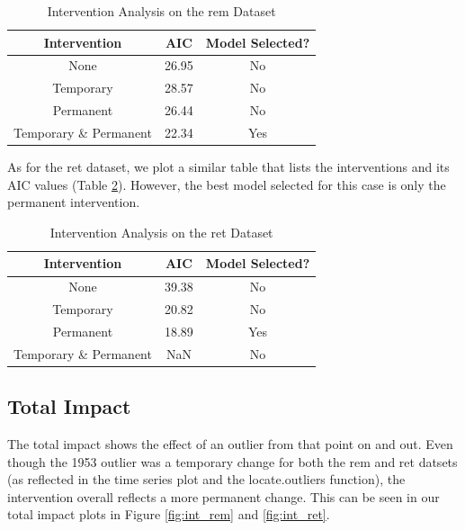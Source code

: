\documentclass[a4paper]{article}
\begin{document}
\begin{table}[h!]
    \centering
    \caption{Intervention Analysis on the rem Dataset}
    \begin{tabular}{|c|c|c|}
    \hline
    Intervention & AIC & Model Selected? \\
    \hline
    None & 26.95 & No \\ 
    \hline
    Temporary & 28.57 & No \\
    \hline
    Permanent & 26.44 & No \\
    \hline
    Temporary \& Permanent & 22.34 & Yes \\
    \hline
    \end{tabular}
    \label{tab:aic4}
\end{table}

As for the ret dataset, we plot a similar table that lists the interventions and its AIC values (Table \ref{tab:aic5}). However, the best model selected for this case is only the permanent intervention.

\begin{table}[h!]
    \centering
    \caption{Intervention Analysis on the ret Dataset}
    \begin{tabular}{|c|c|c|}
    \hline
    Intervention & AIC & Model Selected? \\
    \hline
    None & 39.38 & No \\ 
    \hline
    Temporary & 20.82 & No \\
    \hline
    Permanent & 18.89 & Yes \\
    \hline
    Temporary \& Permanent & NaN & No \\
    \hline
    \end{tabular}
    \label{tab:aic5}
\end{table}

\subsection{Total Impact}
The total impact shows the effect of an outlier from that point on and out. Even though the 1953 outlier was a temporary change for both the rem and ret datsets (as reflected in the time series plot and the locate.outliers function), the intervention overall reflects a more permanent change. This can be seen in our total impact plots in Figure \ref{fig:int_rem} and \ref{fig:int_ret}. \\
\end{document}
